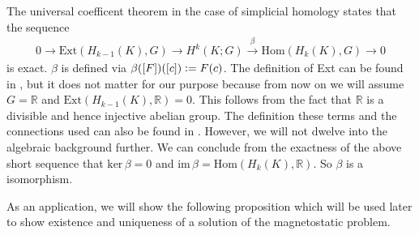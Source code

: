 \documentclass[12pt,a4paper]{article}
\numberwithin{equation}{subsection}
\numberwithin{lemma}{subsection}
\theoremstyle{definition}
\newcommand{\real}{\mathbb{R}}
\begin{document}
The universal coefficent theorem in the case of simplicial homology states
that the sequence 
\begin{align}
    0 \rightarrow \text{Ext}(H_{k-1}(K),G) \rightarrow 
    H^k(K;G) \xrightarrow{\beta} \text{Hom}(H_k(K),G) 
    \rightarrow 0 \label{eq:univeral_coefficient_theorem}
\end{align}
is exact. 
$\beta$ is defined via $\beta([F])([c]) \vcentcolon= F(c)$.
The definition of Ext can be found in \cite{topology_and_geometry},
but it does not matter for our purpose because from now on we will assume
$G = \real$ and
$\text{Ext}(H_{k-1}(K),\real) = 0$. This follows from the fact that 
$\real$ is a divisible and hence injective abelian group. The definition 
these terms and the connections used can also be found in 
\cite[Sec.\,V.6]{topology_and_geometry}. However, we will not dwelve into the 
algebraic background further. We can conclude from the exactness of the 
above short sequence that $\text{ker}\,\beta = 0$ and 
$\text{im}\,\beta = \text{Hom}(H_k(K),\real)$. So $\beta$ is a isomorphism.


As an application, we will show the following proposition which will be used
later to show existence and uniqueness of a 
solution of the magnetostatic problem.
\end{document}
